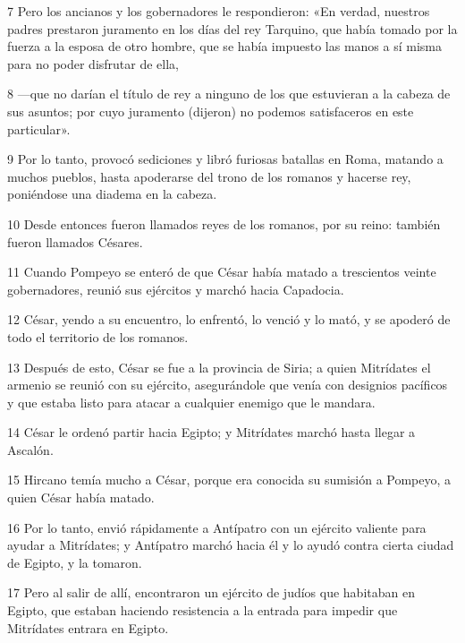 \par 7 Pero los ancianos y los gobernadores le respondieron: «En verdad, nuestros padres prestaron juramento en los días del rey Tarquino, que había tomado por la fuerza a la esposa de otro hombre, que se había impuesto las manos a sí misma para no poder disfrutar de ella,

\par 8 —que no darían el título de rey a ninguno de los que estuvieran a la cabeza de sus asuntos; por cuyo juramento (dijeron) no podemos satisfaceros en este particular».

\par 9 Por lo tanto, provocó sediciones y libró furiosas batallas en Roma, matando a muchos pueblos, hasta apoderarse del trono de los romanos y hacerse rey, poniéndose una diadema en la cabeza.

\par 10 Desde entonces fueron llamados reyes de los romanos, por su reino: también fueron llamados Césares.

\par 11 Cuando Pompeyo se enteró de que César había matado a trescientos veinte gobernadores, reunió sus ejércitos y marchó hacia Capadocia.

\par 12 César, yendo a su encuentro, lo enfrentó, lo venció y lo mató, y se apoderó de todo el territorio de los romanos.

\par 13 Después de esto, César se fue a la provincia de Siria; a quien Mitrídates el armenio se reunió con su ejército, asegurándole que venía con designios pacíficos y que estaba listo para atacar a cualquier enemigo que le mandara.

\par 14 César le ordenó partir hacia Egipto; y Mitrídates marchó hasta llegar a Ascalón.

\par 15 Hircano temía mucho a César, porque era conocida su sumisión a Pompeyo, a quien César había matado.

\par 16 Por lo tanto, envió rápidamente a Antípatro con un ejército valiente para ayudar a Mitrídates; y Antípatro marchó hacia él y lo ayudó contra cierta ciudad de Egipto, y la tomaron.

\par 17 Pero al salir de allí, encontraron un ejército de judíos que habitaban en Egipto, que estaban haciendo resistencia a la entrada para impedir que Mitrídates entrara en Egipto.

